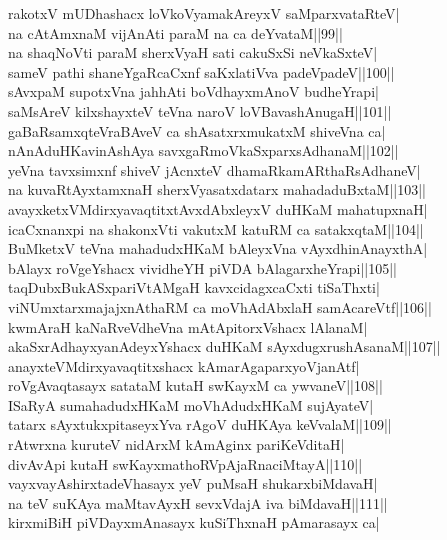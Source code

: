\documentclass{article}
\begin{document}
rakotxV mUDhashacx loVkoVyamakAreyxV saMparxvataRteV|\\
na cAtAmxnaM vijAnAti paraM na ca deYvataM||99||\\
na shaqNoVti paraM sherxVyaH sati cakuSxSi neVkaSxteV|\\
sameV pathi shaneYgaRcaCxnf saKxlatiVva padeVpadeV||100||\\
sAvxpaM supotxVna jahhAti boVdhayxmAnoV budheYrapi|\\
saMsAreV kilxshayxteV teVna naroV loVBavashAnugaH||101||\\
gaBaRsamxqteVraBAveV ca shAsatxrxmukatxM shiveVna ca|\\
nAnAduHKavinAshAya savxgaRmoVkaSxparxsAdhanaM||102||\\
yeVna tavxsimxnf shiveV jAcnxteV dhamaRkamARthaRsAdhaneV|\\
na kuvaRtAyxtamxnaH sherxVyasatxdatarx mahadaduBxtaM||103||\\
avayxketxVMdirxyavaqtitxtAvxdAbxleyxV duHKaM mahatupxnaH|\\
icaCxnanxpi na shakonxVti vakutxM katuRM ca satakxqtaM||104||\\
BuMketxV teVna mahadudxHKaM bAleyxVna vAyxdhinAnayxthA|\\
bAlayx roVgeYshacx vividheYH piVDA bAlagarxheYrapi||105||\\
taqDubxBukASxpariVtAMgaH kavxcidagxcaCxti tiSaThxti|\\
viNUmxtarxmajajxnAthaRM ca moVhAdAbxlaH samAcareVtf||106||\\
kwmAraH kaNaRveVdheVna mAtApitorxVshacx lAlanaM|\\
akaSxrAdhayxyanAdeyxYshacx duHKaM sAyxdugxrushAsanaM||107||\\
anayxteVMdirxyavaqtitxshacx kAmarAgaparxyoVjanAtf|\\
roVgAvaqtasayx satataM kutaH swKayxM ca ywvaneV||108||\\
ISaRyA sumahadudxHKaM moVhAdudxHKaM sujAyateV|\\
tatarx sAyxtukxpitaseyxYva rAgoV duHKAya keVvalaM||109||\\
rAtwrxna kuruteV nidArxM kAmAginx pariKeVditaH|\\
divAvApi kutaH swKayxmathoRVpAjaRnaciMtayA||110||\\
vayxvayAshirxtadeVhasayx yeV puMsaH shukarxbiMdavaH|\\
na teV suKAya maMtavAyxH sevxVdajA iva biMdavaH||111||\\
kirxmiBiH piVDayxmAnasayx kuSiThxnaH pAmarasayx ca|\\
\end{document}

